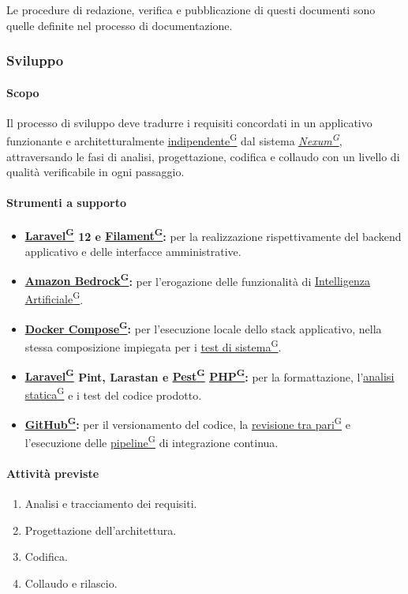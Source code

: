 \documentclass[a4paper,12pt]{article}
\providecommand{\glslink}[2]{\href{https://alittlebyte-19.github.io/Documentazione/glossario.html\#gls-#1}{\underline{#2}\textsuperscript{\scriptsize G}}}
\begin{document}
Le procedure di redazione, verifica e pubblicazione di questi documenti sono quelle definite nel processo di documentazione.

\subsubsection{Sviluppo}

\paragraph{Scopo}
Il processo di sviluppo deve tradurre i requisiti concordati in un applicativo funzionante e architetturalmente \glslink{standalone}{indipendente} dal sistema \textit{\glslink{nexum}{Nexum}}, attraversando le fasi di analisi, progettazione, codifica e collaudo con un livello di qualità verificabile in ogni passaggio.

\paragraph{Strumenti a supporto}
\begin{itemize}
    \item \textbf{\glslink{laravel}{Laravel} 12 e \glslink{filament}{Filament}:} per la realizzazione rispettivamente del backend applicativo e delle interfacce amministrative.
    \item \textbf{\glslink{amazon-bedrock}{Amazon Bedrock}:} per l'erogazione delle funzionalità di \glslink{intelligenza-artificiale-ai}{Intelligenza Artificiale}.
    \item \textbf{\glslink{docker-compose}{Docker Compose}:} per l'esecuzione locale dello stack applicativo, nella stessa composizione impiegata per i \glslink{test-di-sistema}{test di sistema}.
    \item \textbf{\glslink{laravel}{Laravel} Pint, Larastan e \glslink{pest}{Pest} \glslink{php}{PHP}:} per la formattazione, l'\glslink{analisi-statica}{analisi statica} e i test del codice prodotto.
    \item \textbf{\glslink{github}{GitHub}:} per il versionamento del codice, la \glslink{code-review}{revisione tra pari} e l'esecuzione delle \glslink{workflow}{pipeline} di integrazione continua.
\end{itemize}

\paragraph{Attività previste}
\begin{enumerate}
    \item Analisi e tracciamento dei requisiti.
    \item Progettazione dell'architettura.
    \item Codifica.
    \item Collaudo e rilascio.
\end{enumerate}
\end{document}
